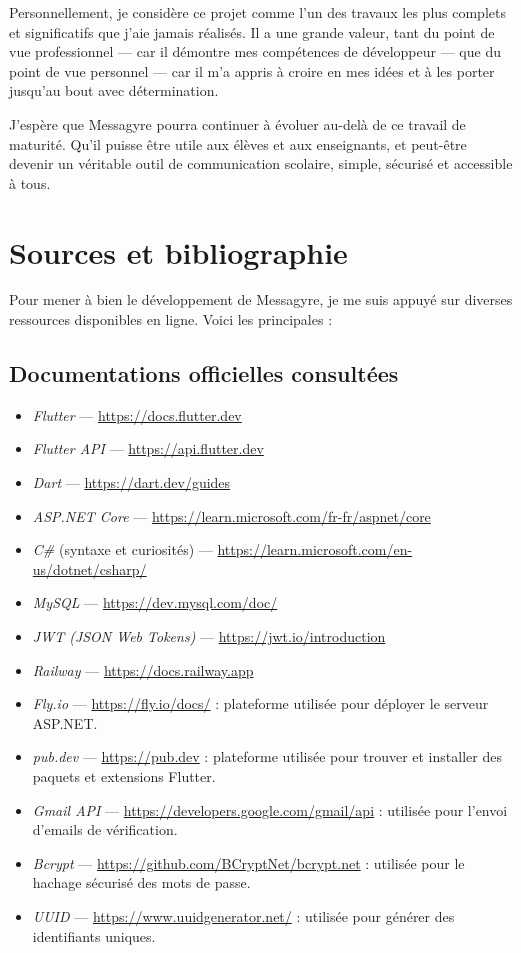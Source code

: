 \documentclass[12pt]{report}
\begin{document}
	Personnellement, je considère ce projet comme l’un des travaux les plus complets et significatifs que j’aie jamais réalisés. Il a une grande valeur, tant du point de vue professionnel — car il démontre mes compétences de développeur — que du point de vue personnel — car il m’a appris à croire en mes idées et à les porter jusqu’au bout avec détermination.
	
	J’espère que Messagyre pourra continuer à évoluer au-delà de ce travail de maturité. Qu’il puisse être utile aux élèves et aux enseignants, et peut-être devenir un véritable outil de communication scolaire, simple, sécurisé et accessible à tous.
	
	
	\chapter{Sources et bibliographie}
	
	Pour mener à bien le développement de Messagyre, je me suis appuyé sur diverses ressources disponibles en ligne. Voici les principales :
	
	\printbibliography[heading=none]
	
	\section{Documentations officielles consultées}
	
	\begin{itemize}
		\item \textit{Flutter} — \url{https://docs.flutter.dev}
		\item \textit{Flutter API} — \url{https://api.flutter.dev}
		\item \textit{Dart} — \url{https://dart.dev/guides}
		\item \textit{ASP.NET Core} — \url{https://learn.microsoft.com/fr-fr/aspnet/core}
		\item \textit{C\#} (syntaxe et curiosités) — \url{https://learn.microsoft.com/en-us/dotnet/csharp/}
		\item \textit{MySQL} — \url{https://dev.mysql.com/doc/}
		\item \textit{JWT (JSON Web Tokens)} — \url{https://jwt.io/introduction}
		\item \textit{Railway} — \url{https://docs.railway.app}
		\item \textit{Fly.io} — \url{https://fly.io/docs/} : plateforme utilisée pour déployer le serveur ASP.NET.
		\item \textit{pub.dev} — \url{https://pub.dev} : plateforme utilisée pour trouver et installer des paquets et extensions Flutter.
		\item \textit{Gmail API} — \url{https://developers.google.com/gmail/api} : utilisée pour l’envoi d’emails de vérification.
		\item \textit{Bcrypt} — \url{https://github.com/BCryptNet/bcrypt.net} : utilisée pour le hachage sécurisé des mots de passe.
		\item \textit{UUID} — \url{https://www.uuidgenerator.net/} : utilisée pour générer des identifiants uniques.
	\end{itemize}
	
\end{document}
